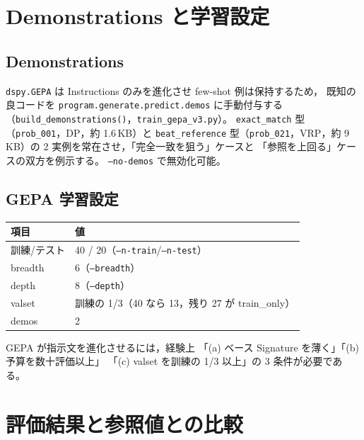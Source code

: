 \documentclass[uplatex,dvipdfmx,a4paper,11pt]{jsarticle}
\begin{document}
\section{Demonstrations と学習設定}\label{sec:demo}

\subsection{Demonstrations}

\texttt{dspy.GEPA} は Instructions のみを進化させ few-shot 例は保持するため，
既知の良コードを \texttt{program.generate.predict.demos} に手動付与する
（\texttt{build\_demonstrations()}，\texttt{train\_gepa\_v3.py}）。
\texttt{exact\_match} 型（\texttt{prob\_001}，DP，約 1.6\,KB）と
\texttt{beat\_reference} 型（\texttt{prob\_021}，VRP，約 9\,KB）の
2 実例を常在させ，「完全一致を狙う」ケースと
「参照を上回る」ケースの双方を例示する。
\texttt{--no-demos} で無効化可能。

\subsection{GEPA 学習設定}

\begin{center}
\begin{tabular}{ll}
  \toprule
  項目 & 値 \\
  \midrule
  訓練/テスト & 40 / 20（\texttt{--n-train}/\texttt{--n-test}） \\
  breadth & 6（\texttt{--breadth}） \\
  depth & 8（\texttt{--depth}） \\
  valset & 訓練の 1/3（40 なら 13，残り 27 が train\_only） \\
  demos & 2 \\
  \bottomrule
\end{tabular}
\end{center}

GEPA が指示文を進化させるには，経験上
「(a) ベース Signature を薄く」「(b) 予算を数十評価以上」
「(c) valset を訓練の 1/3 以上」の 3 条件が必要である。

\section{評価結果と参照値との比較}\label{sec:results}
\end{document}
